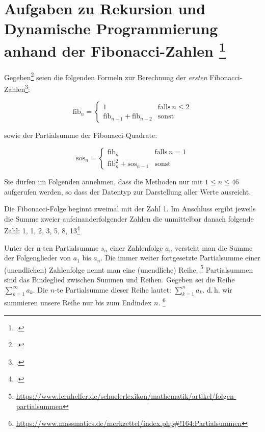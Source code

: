 \documentclass{lehramt-informatik-minimal}
\begin{document}
\section{Aufgaben zu Rekursion und Dynamische Programmierung anhand der
Fibonacci-Zahlen
\footcite[Seite 1]{aud:pu:3}}

Gegeben\footcite[Thema 1 Aufgabe 3 Seite 5]{examen:66115:2017:03} seien die folgenden Formeln zur
Berechnung der \emph{ersten}
Fibonacci-Zahlen\footcite{wiki:fibonacci-folge}:

\begin{equation*}
\text{fib}_n =
\begin{cases}
1 & \text{falls}\ n \leq 2\\
\text{fib}_{n-1} + \text{fib}_{n-2} & \text{sonst}
\end{cases}
\end{equation*}

sowie der Partialsumme der Fibonacci-Quadrate:

\begin{equation*}
\text{sos}_n =
\begin{cases}
\text{fib}_n & \text{falls}\ n = 1\\
\text{fib}_n^2 + \text{sos}_{n-1} & \text{sonst}
\end{cases}
\end{equation*}

\noindent
Sie dürfen im Folgenden annehmen, dass die Methoden nur mit $1 \leq n
\leq 46$ aufgerufen werden, so dass der Datentyp  zur
Darstellung aller Werte ausreicht.

\begin{exkurs}
Die Fibonacci-Folge beginnt zweimal mit der Zahl 1.
Im Anschluss ergibt jeweils die Summe zweier aufeinanderfolgender Zahlen
die unmittelbar danach folgende Zahl: 1, 1, 2, 3, 5, 8, 13\footcite{wiki:fibonacci-folge}
\end{exkurs}

\begin{exkurs}[Partialsumme]
Unter der n-ten Partialsumme $s_n$ einer Zahlenfolge $a_n$ versteht man
die Summe der Folgenglieder von $a_1$ bis $a_n$. Die immer
weiter fortgesetzte Partialsumme einer (unendlichen) Zahlenfolge nennt
man eine (unendliche) Reihe.
\footnote{\url{https://www.lernhelfer.de/schuelerlexikon/mathematik/artikel/folgen-partialsummen}}
Partialsummen sind das Bindeglied zwischen Summen und Reihen.
Gegeben sei die Reihe $\sum_{k = 1}^{\infty} a_k$.
Die $n$-te Partialsumme dieser Reihe lautet: $\sum_{k = 1}^{n} a_k$.
d.\,h. wir summieren unsere Reihe nur bis zum Endindex $n$.
\footnote{\url{https://www.massmatics.de/merkzettel/index.php\#!164:Partialsummen}}
\end{exkurs}
\end{document}
